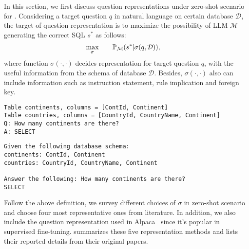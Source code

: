 In this section, we first discuss question representations under zero-shot scenario for \nlsql.
Considering a target question $q$ in natural language on certain database $\mathcal{D}$, the target of question representation is to maximize the possibility of LLM $\mathcal{M}$ generating the correct SQL $s^*$ as follows:
\begin{align*} 
    \centering
    \underset{\sigma}{\max}\qquad &\mathbb{P}_{\mathcal{M}}(s^*|\sigma(q, \mathcal{D})),
\end{align*}
where function $\sigma(\cdot, \cdot)$ decides representation for target question $q$, with the useful information from the schema of database $\mathcal{D}$. 
Besides, $\sigma(\cdot, \cdot)$ also can include information such as instruction statement, rule implication and foreign key.
{
\begin{lstlisting}[language=Prompt, caption={Example of \bsprompt}, float=t, label={lst:bsprompt}]
Table continents, columns = [ContId, Continent]
Table countries, columns = [CountryId, CountryName, Continent]
Q: How many continents are there?
A: SELECT
\end{lstlisting}

\begin{lstlisting}[language=Prompt, caption={Example of \textprompt}, label={lst:textprompt}, float=t]
Given the following database schema:
continents: ContId, Continent
countries: CountryId, CountryName, Continent

Answer the following: How many continents are there?
SELECT
\end{lstlisting}
}

Follow the above definition, we survey different choices of $\sigma$ in zero-shot scenario and choose four most representative ones from literature. 
In addition, we also include the question representation used in Alpaca~\cite{alpaca} since it's popular in supervised fine-tuning. 
 summarizes these five representation methods and lists their reported details from their original papers. 


